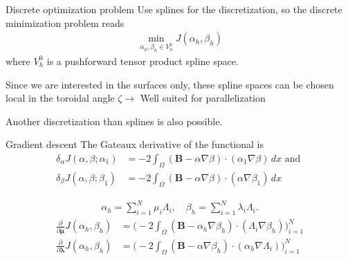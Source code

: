 \documentclass[
	english,%
	logo=false,%
	eurofusion=false, %
	titlegraphic=true, %
	]{ippbeamer}
\begin{document}
\begin{frame}{Discrete optimization problem}
	Use splines for the discretization, so the discrete minimization problem reads
	\begin{align*}
		\min_{\alpha_h, \beta_h \in V^0_h} J(\alpha_h, \beta_h)
	\end{align*}
	where $V^0_h$ is a pushforward tensor product spline space. 


	\begin{alertblock}{}
		Since we are interested in the surfaces only, these spline spaces can be chosen
		local in the toroidal angle $\zeta \rightarrow$ Well suited for parallelization
	\end{alertblock}

	\begin{exampleblock}{}
		Another discretization than splines is also possible.
	\end{exampleblock}
\end{frame}

\begin{frame}{Gradient descent}
	The Gateaux derivative of the functional is 
	\begin{align*}
		\delta_\alpha J(\alpha, \beta; \alpha_1) &= 
			-2 \int_\Omega (\mathbf{B} - \alpha \nabla \beta) \cdot (\alpha_1 \nabla \beta) \, dx \text{ and } \\
		\delta_\beta J(\alpha, \beta; \beta_1) &= 
			-2 \int_\Omega (\mathbf{B} - \alpha \nabla \beta) \cdot (\alpha \nabla \beta_1) \, dx
	\end{align*}

	\begin{align*}
		\alpha_h = \sum_{i=1}^{N} \mu_i \Lambda_i, \quad \beta_h = \sum_{i=1}^{N} \lambda_i \Lambda_i. 
	\end{align*}
	\begin{align*}
		\frac{\partial}{\partial \bm{\mu}} J(\alpha_h, \beta_h)
			&= \bigg( -2 \int_\Omega (\mathbf{B} - \alpha_h \nabla \beta_h) 
			\cdot (\Lambda_i \nabla \beta_h) \bigg)_{i=1}^N \\
		\frac{\partial}{\partial \bm{\lambda}} J(\alpha_h, \beta_h)
			&= \bigg( -2 \int_\Omega (\mathbf{B} - \alpha \nabla \beta_h) 
			\cdot (\alpha_h \nabla \Lambda_i)\bigg)_{i=1}^N
	\end{align*}

\end{frame}
\end{document}
